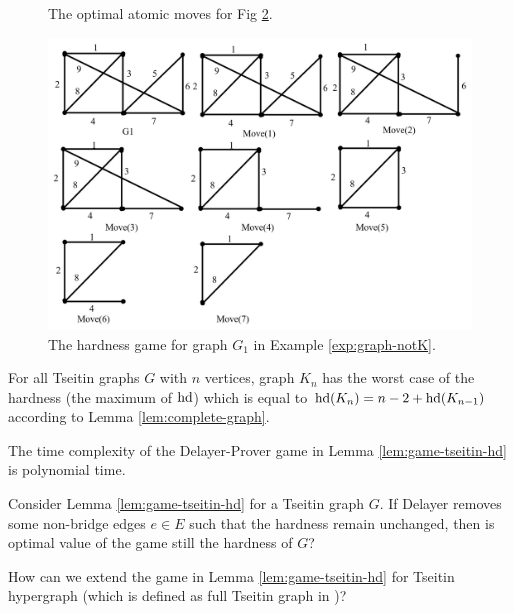 \documentclass{report}
\begin{document}
\begin{examp}
\begin{figure}[h]
\begin{tabular}{|c|c|}
   \end{tabular}
   \caption{The optimal atomic moves for Fig \ref{fig:hd4}.} \label{fig:game4}
   \end{figure}
   \begin{figure}
   \begin{center}
   \includegraphics[scale =0.4]{graph_hd1.png}
   \caption{The hardness game for graph $G_1$ in Example \ref{exp:graph-notK}.}  \label{fig:hd4}
   \end{center}
   \end{figure}
\end{examp}
  
\begin{conj}\label{con:hd_game2}
For all Tseitin graphs $G$ with $n$ vertices, graph $K_n$ has the worst case of the hardness (the maximum of $\operatorname{hd}$) which is equal to $\operatorname{hd}(K_n)= n-2+\operatorname{hd}(K_{n-1})$ according to Lemma \ref{lem:complete-graph}.
\end{conj}

\begin{conj}\label{con:hd-game-time}
The time complexity of the Delayer-Prover game in Lemma \ref{lem:game-tseitin-hd} is polynomial time.
\end{conj}

\begin{quest}\label{que:gamehd-move}
Consider Lemma \ref{lem:game-tseitin-hd} for a Tseitin graph $G$. If Delayer removes some non-bridge edges $e \in E$ such that the hardness remain unchanged, then is optimal value of the game still the hardness of $G$?
\end{quest}

\begin{quest}\label{que:gamehd}
How can we extend the game in Lemma \ref{lem:game-tseitin-hd} for Tseitin hypergraph (which is defined as full Tseitin graph in \cite{BeyersdorffGwynneKullmann2013PHPER})?
\end{quest}
\end{document}
